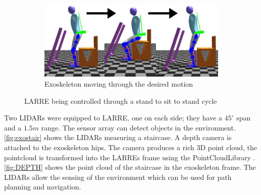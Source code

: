 \begin{figure}[h!]
\begin{subfigure}{0.5\textwidth}
\end{subfigure}
    \begin{subfigure}{0.5\textwidth}
        \centering
        \includegraphics[scale=.5]{images/sim/sit_to_stand2 (1).png}
        \caption{Exoskeleton moving through the desired motion}
    \label{fig:sit2stand}
\end{subfigure}
    \caption[LARRE Simulation standing to sit motion]{LARRE being controlled through a stand to sit to stand cycle}
    \label{fig:simwalking}
\end{figure}
 
 
 
 Two LIDARs were equipped to LARRE, one on each side; they have a $45^{\circ}$ span and a $1.5m$ range. The sensor array can detect objects in the environment. \autoref{fig:exostair} shows the LIDARs measuring a staircase. A depth camera is attached to the exoskeleton hips. The camera produces a rich 3D point cloud, the pointcloud is transformed into the LARREs frame using the PointCloudLibrary \cite{Rusu_ICRA2011_PCL}.  \autoref{fig:DEPTH} shows the point cloud of the staircase in the exoskeleton frame. The LIDARs allow the sensing of the environment which can be used for path planning and navigation. 

